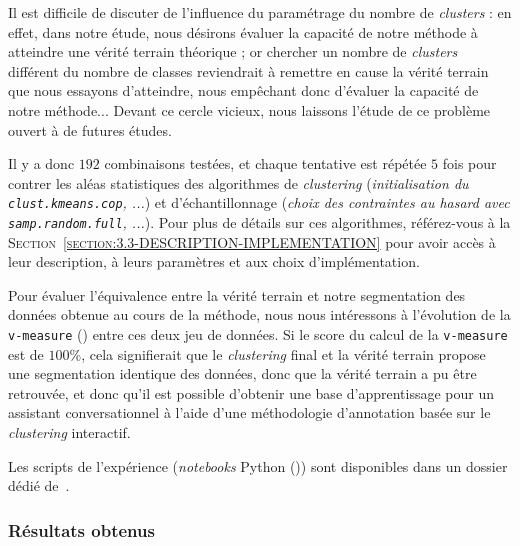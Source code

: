 			\begin{leftBarAuthorOpinion}
				Il est difficile de discuter de l'influence du paramétrage du nombre de \textit{clusters} :
				en effet, dans notre étude, nous désirons évaluer la capacité de notre méthode à atteindre une vérité terrain théorique ; or chercher un nombre de \textit{clusters} différent du nombre de classes reviendrait à remettre en cause la vérité terrain que nous essayons d'atteindre, nous empêchant donc d'évaluer la capacité de notre méthode...
				Devant ce cercle vicieux, nous laissons l'étude de ce problème ouvert à de futures études.
			\end{leftBarAuthorOpinion}
			
			Il y a donc $192$ combinaisons testées, et chaque tentative est répétée $5$ fois pour contrer les aléas statistiques des algorithmes de \textit{clustering} (\textit{initialisation du \texttt{clust.kmeans.cop}, ...}) et d'échantillonnage (\textit{choix des contraintes au hasard avec \texttt{samp.random.full}, ...}).
			Pour plus de détails sur ces algorithmes, référez-vous à la \textsc{Section~\ref{section:3.3-DESCRIPTION-IMPLEMENTATION}} pour avoir accès à leur description, à leurs paramètres et aux choix d'implémentation.
			
			Pour évaluer l'équivalence entre la vérité terrain et notre segmentation des données obtenue au cours de la méthode, nous nous intéressons à l'évolution de la \texttt{v-measure} (\cite{rosenberg-hirschberg:2007:vmeasure-conditional-entropybased}) entre ces deux jeu de données.
			Si le score du calcul de la \texttt{v-measure} est de $100$\%, cela signifierait que le \textit{clustering} final et la vérité terrain propose une segmentation identique des données, donc que la vérité terrain a pu être retrouvée, et donc qu'il est possible d'obtenir une base d'apprentissage pour un assistant conversationnel à l'aide d'une méthodologie d'annotation basée sur le \textit{clustering} interactif.
			
			\begin{leftBarInformation}
				Les scripts de l'expérience (\textit{notebooks} Python (\cite{van-rossum-drake:2009:python-reference-manual})) sont disponibles dans un dossier dédié de~\cite{schild:2021:cognitivefactory-interactiveclusteringcomparativestudy}.
			\end{leftBarInformation}

		\subsubsection{Résultats obtenus}
			
